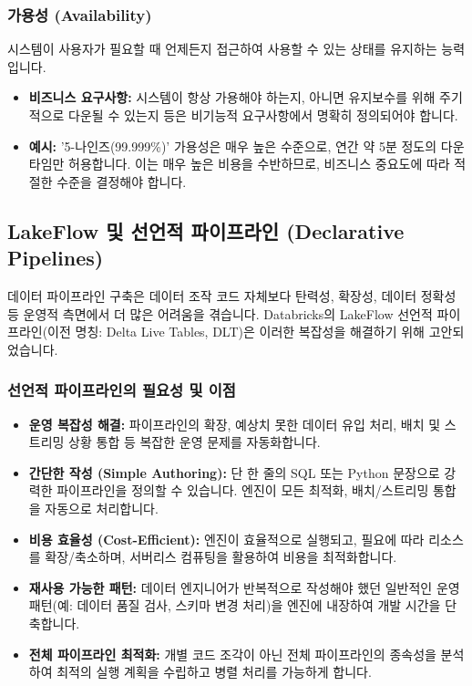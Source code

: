 \documentclass[11pt,a4paper]{article}
\begin{document}
\begin{enumerate}
\subsubsection{가용성 (Availability)}
\begin{conceptbox}
시스템이 사용자가 필요할 때 언제든지 접근하여 사용할 수 있는 상태를 유지하는 능력입니다.
\end{conceptbox}
\begin{itemize}
    \item \textbf{비즈니스 요구사항:} 시스템이 항상 가용해야 하는지, 아니면 유지보수를 위해 주기적으로 다운될 수 있는지 등은 비기능적 요구사항에서 명확히 정의되어야 합니다.
    \item \textbf{예시:} '5-나인즈(99.999\%)' 가용성은 매우 높은 수준으로, 연간 약 5분 정도의 다운타임만 허용합니다. 이는 매우 높은 비용을 수반하므로, 비즈니스 중요도에 따라 적절한 수준을 결정해야 합니다.
\end{itemize}

\newpage
\subsection{LakeFlow 및 선언적 파이프라인 (Declarative Pipelines)}

데이터 파이프라인 구축은 데이터 조작 코드 자체보다 탄력성, 확장성, 데이터 정확성 등 운영적 측면에서 더 많은 어려움을 겪습니다. Databricks의 LakeFlow 선언적 파이프라인(이전 명칭: Delta Live Tables, DLT)은 이러한 복잡성을 해결하기 위해 고안되었습니다.

\subsubsection{선언적 파이프라인의 필요성 및 이점}
\begin{itemize}
    \item \textbf{운영 복잡성 해결:} 파이프라인의 확장, 예상치 못한 데이터 유입 처리, 배치 및 스트리밍 상황 통합 등 복잡한 운영 문제를 자동화합니다.
    \item \textbf{간단한 작성 (Simple Authoring):} 단 한 줄의 SQL 또는 Python 문장으로 강력한 파이프라인을 정의할 수 있습니다. 엔진이 모든 최적화, 배치/스트리밍 통합을 자동으로 처리합니다.
    \item \textbf{비용 효율성 (Cost-Efficient):} 엔진이 효율적으로 실행되고, 필요에 따라 리소스를 확장/축소하며, 서버리스 컴퓨팅을 활용하여 비용을 최적화합니다.
    \item \textbf{재사용 가능한 패턴:} 데이터 엔지니어가 반복적으로 작성해야 했던 일반적인 운영 패턴(예: 데이터 품질 검사, 스키마 변경 처리)을 엔진에 내장하여 개발 시간을 단축합니다.
    \item \textbf{전체 파이프라인 최적화:} 개별 코드 조각이 아닌 전체 파이프라인의 종속성을 분석하여 최적의 실행 계획을 수립하고 병렬 처리를 가능하게 합니다.
\end{itemize}


\end{enumerate}
\end{document}
